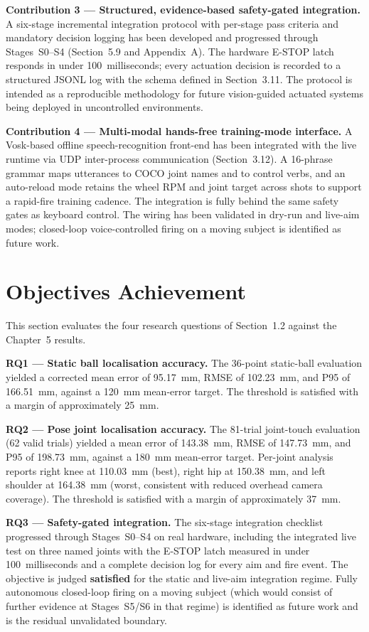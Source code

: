 \textbf{Contribution 3 --- Structured, evidence-based safety-gated integration.} A six-stage incremental integration protocol with per-stage pass criteria and mandatory decision logging has been developed and progressed through Stages~S0--S4 (Section~5.9 and Appendix~A). The hardware E-STOP latch responds in under 100~milliseconds; every actuation decision is recorded to a structured JSONL log with the schema defined in Section~3.11. The protocol is intended as a reproducible methodology for future vision-guided actuated systems being deployed in uncontrolled environments.

\textbf{Contribution 4 --- Multi-modal hands-free training-mode interface.} A Vosk-based offline speech-recognition front-end has been integrated with the live runtime via UDP inter-process communication (Section~3.12). A 16-phrase grammar maps utterances to COCO joint names and to control verbs, and an auto-reload mode retains the wheel RPM and joint target across shots to support a rapid-fire training cadence. The integration is fully behind the same safety gates as keyboard control. The wiring has been validated in dry-run and live-aim modes; closed-loop voice-controlled firing on a moving subject is identified as future work.

\section{Objectives Achievement}

This section evaluates the four research questions of Section~1.2 against the Chapter~5 results.

\textbf{RQ1 --- Static ball localisation accuracy.} The 36-point static-ball evaluation yielded a corrected mean error of 95.17~mm, RMSE of 102.23~mm, and P95 of 166.51~mm, against a 120~mm mean-error target. The threshold is satisfied with a margin of approximately 25~mm.

\textbf{RQ2 --- Pose joint localisation accuracy.} The 81-trial joint-touch evaluation (62 valid trials) yielded a mean error of 143.38~mm, RMSE of 147.73~mm, and P95 of 198.73~mm, against a 180~mm mean-error target. Per-joint analysis reports right knee at 110.03~mm (best), right hip at 150.38~mm, and left shoulder at 164.38~mm (worst, consistent with reduced overhead camera coverage). The threshold is satisfied with a margin of approximately 37~mm.

\textbf{RQ3 --- Safety-gated integration.} The six-stage integration checklist progressed through Stages~S0--S4 on real hardware, including the integrated live test on three named joints with the E-STOP latch measured in under 100~milliseconds and a complete decision log for every aim and fire event. The objective is judged \textbf{satisfied} for the static and live-aim integration regime. Fully autonomous closed-loop firing on a moving subject (which would consist of further evidence at Stages~S5/S6 in that regime) is identified as future work and is the residual unvalidated boundary.


